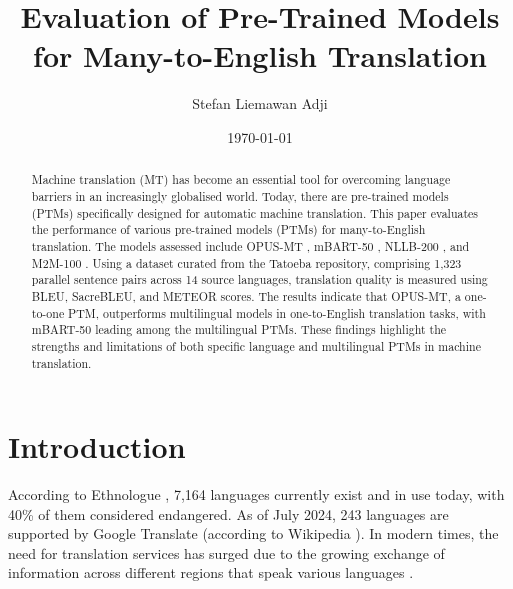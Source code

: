 \documentclass[a4paper]{article}
\title{Evaluation of Pre-Trained Models for Many-to-English Translation}
\author{Stefan Liemawan Adji}
\date{\today}
\begin{document}
\maketitle


\begin{abstract}
    Machine translation (MT) has become an essential tool for overcoming language barriers in an increasingly globalised world. Today, there are pre-trained models (PTMs) specifically designed for automatic machine translation. This paper evaluates the performance of various pre-trained models (PTMs) for many-to-English translation. The models assessed include OPUS-MT \cite{tiedemann-2020-opus-mt}, mBART-50 \cite{liu-2020-mbart}, NLLB-200 \cite{nllb200-2020}, and M2M-100 \cite{fan-2020-m2m100}. Using a dataset curated from the Tatoeba repository, comprising 1,323 parallel sentence pairs across 14 source languages, translation quality is measured using BLEU, SacreBLEU, and METEOR scores. The results indicate that OPUS-MT, a one-to-one PTM, outperforms multilingual models in one-to-English translation tasks, with mBART-50 leading among the multilingual PTMs. These findings highlight the strengths and limitations of both specific language and multilingual PTMs in machine translation.
\end{abstract}

\section{Introduction}

According to Ethnologue \cite{ethnologue-2024}, 7,164 languages currently exist and in use today, with 40\% of them considered endangered. As of July 2024, 243 languages are supported by Google Translate (according to Wikipedia \cite{wikipedia-google-translate}). In modern times, the need for translation services has surged due to the growing exchange of information across different regions that speak various languages \cite{okpor-2014-machine-ta}.
\end{document}
